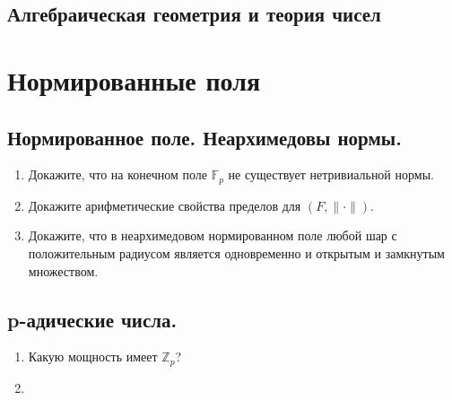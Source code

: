 \documentclass[11pt]{article}
\begin{document}
\begin{center}
        \section*{Алгебраическая геометрия и теория чисел}
    \end{center}
    \tableofcontents
    \newpage

    \section{Нормированные поля}
    \subsection{Нормированное поле. Неархимедовы нормы.}
    \begin{enumerate}[start=1,label={\bfseries \arabic*.}]
        \item Докажите, что на конечном поле $\mathbb{F}_{p}$ не существует нетривиальной нормы.

        \item Докажите арифметические свойства пределов для $(F, \| \cdot \|)$.

        \item Докажите, что в неархимедовом нормированном поле любой шар с положительным радиусом является одновременно и открытым
              и замкнутым множеством.
    \end{enumerate}
    \subsection{p-адические числа.}
    \begin{enumerate}[start=4,label={\bfseries \arabic*.}]
        \item Какую мощность имеет $\mathbb{Z}_p$?

        \item
    \end{enumerate}
\end{document}
